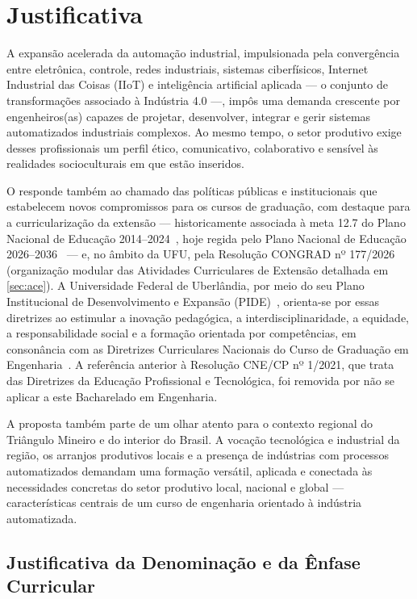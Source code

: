 \section{Justificativa}

A expansão acelerada da automação industrial, impulsionada pela convergência entre eletrônica, controle, redes industriais, sistemas ciberfísicos, Internet Industrial das Coisas (IIoT) e inteligência artificial aplicada — o conjunto de transformações associado à Indústria 4.0 —, impôs uma demanda crescente por engenheiros(as) capazes de projetar, desenvolver, integrar e gerir sistemas automatizados industriais complexos. Ao mesmo tempo, o setor produtivo exige desses profissionais um perfil ético, comunicativo, colaborativo e sensível às realidades socioculturais em que estão inseridos.

O \ppccurso responde também ao chamado das políticas públicas e institucionais que estabelecem novos compromissos para os cursos de graduação, com destaque para a curricularização da extensão — historicamente associada à meta 12.7 do Plano Nacional de Educação 2014--2024~\cite{mec_pne_2014}, hoje regida pelo Plano Nacional de Educação 2026--2036~\cite{mec_pne_2026} — e, no âmbito da UFU, pela Resolução CONGRAD nº 177/2026~\cite{ufu_congrad_177_2026} (organização modular das Atividades Curriculares de Extensão detalhada em \autoref{sec:ace}). A Universidade Federal de Uberlândia, por meio do seu Plano Institucional de Desenvolvimento e Expansão (PIDE)~\cite{ufu_consun_31_2022}, orienta-se por essas diretrizes ao estimular a inovação pedagógica, a interdisciplinaridade, a equidade, a responsabilidade social e a formação orientada por competências, em consonância com as Diretrizes Curriculares Nacionais do Curso de Graduação em Engenharia~\cite{cne_ces_2_2019,cne_ces_1_2021}. A referência anterior à Resolução CNE/CP nº 1/2021, que trata das Diretrizes da Educação Profissional e Tecnológica, foi removida por não se aplicar a este Bacharelado em Engenharia.

A proposta também parte de um olhar atento para o contexto regional do Triângulo Mineiro e do interior do Brasil. A vocação tecnológica e industrial da região, os arranjos produtivos locais e a presença de indústrias com processos automatizados demandam uma formação versátil, aplicada e conectada às necessidades concretas do setor produtivo local, nacional e global — características centrais de um curso de engenharia orientado à indústria automatizada.

\subsection{Justificativa da Denominação e da Ênfase Curricular}

